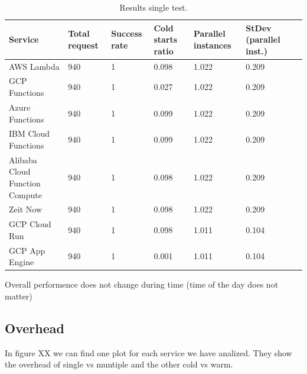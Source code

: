 \documentclass[11pt]{article}
\begin{document}
\begin{table}
\centering
 \begin{tabularx}{1\textwidth}{p{4cm} X X X X X X}
 \textbf{Service} & \textbf{Total request} & \textbf{Success rate} & \textbf{Cold starts ratio} & \textbf{Parallel instances} & \textbf{StDev (parallel inst.)} \\
 \hline
 \hline
 AWS Lambda & 940 & 1 & 0.098 & 1.022 & 0.209\\
 \hline
 GCP Functions & 940 & 1 & 0.027 & 1.022 & 0.209\\
 \hline
 Azure Functions & 940 & 1 & 0.099 & 1.022 & 0.209\\
 \hline
 IBM Cloud Functions & 940 & 1 & 0.099 & 1.022 & 0.209\\
 \hline
 Alibaba Cloud Function Compute & 940 & 1 & 0.098 & 1.022 & 0.209\\
 \hline
 Zeit Now & 940 & 1 & 0.098 & 1.022 & 0.209\\
 \hline
 GCP Cloud Run & 940 & 1 & 0.098 & 1.011 & 0.104\\
 \hline
 GCP App Engine & 940 & 1 & 0.001 & 1.011 & 0.104\\
 \hline

\end{tabularx}
\caption{Results single test.}
\label{Tab:single}
\end{table}


Overall performence does not change during time (time of the day does not matter)


\subsection{Overhead}

In figure XX we can find one plot for each service we have analized. They show the overhead of single vs muntiple and the other cold vs warm.


\end{document}
